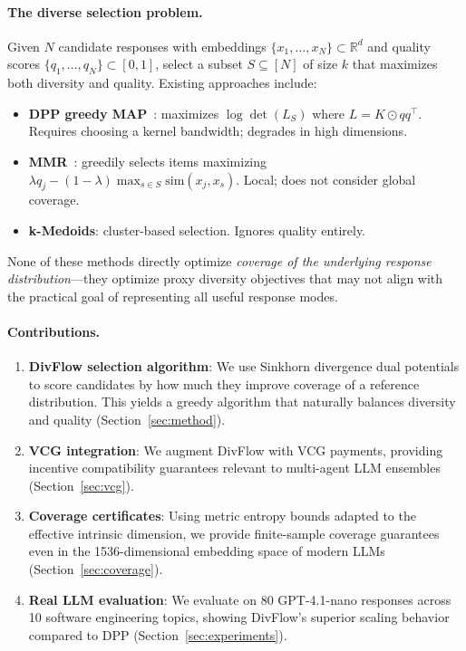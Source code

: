 \documentclass[10pt]{article}
\begin{document}
\paragraph{The diverse selection problem.}
Given $N$ candidate responses with embeddings $\{x_1, \ldots, x_N\} \subset \mathbb{R}^d$ and quality scores $\{q_1, \ldots, q_N\} \subset [0,1]$, select a subset $S \subseteq [N]$ of size $k$ that maximizes both diversity and quality.
Existing approaches include:
\begin{itemize}[leftmargin=*,itemsep=1pt]
  \item \textbf{DPP greedy MAP}~\citep{kulesza2012determinantal}: maximizes $\log\det(L_S)$ where $L = K \odot qq^\top$. Requires choosing a kernel bandwidth; degrades in high dimensions.
  \item \textbf{MMR}~\citep{carbonell1998mmr}: greedily selects items maximizing $\lambda q_j - (1-\lambda) \max_{s \in S} \text{sim}(x_j, x_s)$. Local; does not consider global coverage.
  \item \textbf{k-Medoids}: cluster-based selection. Ignores quality entirely.
\end{itemize}

None of these methods directly optimize \emph{coverage of the underlying response distribution}---they optimize proxy diversity objectives that may not align with the practical goal of representing all useful response modes.

\paragraph{Contributions.}
\begin{enumerate}[leftmargin=*,itemsep=2pt]
  \item \textbf{DivFlow selection algorithm}: We use Sinkhorn divergence dual potentials to score candidates by how much they improve coverage of a reference distribution. This yields a greedy algorithm that naturally balances diversity and quality (Section~\ref{sec:method}).
  \item \textbf{VCG integration}: We augment DivFlow with VCG payments, providing incentive compatibility guarantees relevant to multi-agent LLM ensembles (Section~\ref{sec:vcg}).
  \item \textbf{Coverage certificates}: Using metric entropy bounds adapted to the effective intrinsic dimension, we provide finite-sample coverage guarantees even in the 1536-dimensional embedding space of modern LLMs (Section~\ref{sec:coverage}).
  \item \textbf{Real LLM evaluation}: We evaluate on 80 GPT-4.1-nano responses across 10 software engineering topics, showing DivFlow's superior scaling behavior compared to DPP (Section~\ref{sec:experiments}).
\end{enumerate}
\end{document}
